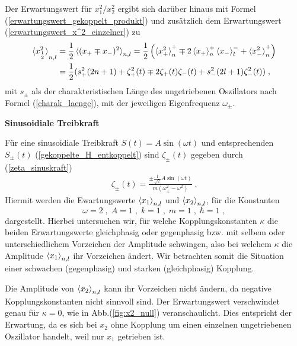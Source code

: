     Der Erwartungswert für $x_{1}^2/x_2^2$ ergibt sich darüber hinaus mit Formel (\ref{erwartungswert_gekoppelt_produkt}) und zusätzlich dem Erwartungswert (\ref{erwartungswert_x^2_einzelner}) zu
    \begin{align}
      \braket{x_{1\atop 2}^2}_{n,l}&=\frac{1}{2}\braket{(x_+\mp x_-)^2}_{n,l}
      =\frac{1}{2}\left(\braket{x_+^2}_n^+ \mp 2\braket{x_+}_n^+\braket{x_-}_l^- + \braket{x_-^2}_n^+\right) \notag\\
      &=\frac 1 2 (s_+^2(2n+1)+\zeta_+^2(t) \mp 2\zeta_+(t)\zeta_-(t) + s_-^2(2l+1)\zeta_-^2(t)) \; ,
    \end{align}
    mit $s_\pm$ als der charakteristischen Länge des ungetriebenen Oszillators nach Formel (\ref{charak_laenge}), mit der jeweiligen Eigenfrequenz $\omega_\pm$.

    \textbf{Sinusoidiale Treibkraft}

    Für eine sinusoidiale Treibkraft $S(t)=A\sin(\omega t)$ und entsprechenden $S_\pm(t)$ (\ref{gekoppelte_H_entkoppelt}) sind $\zeta_\pm(t)$ gegeben durch (\ref{zeta_sinuskraft})
    \begin{align}
      \zeta_\pm(t) = \frac{\pm\frac{1}{\sqrt 2} A\sin(\omega t)}{m(\omega_\pm^2 - \omega^2)} \; .
    \end{align}
    Hiermit werden die Ewartungswerte $\braket{x_1}_{n,l}$ und $\braket{x_2}_{n,l}$, für die Konstanten
    \begin{equation}
      \omega=2 \;,\; A=1 \;,\; k=1 \;,\; m=1 \;,\; \hbar=1 \; ,
    \end{equation}
    dargestellt.
    Hierbei untersuchen wir, für welche Kopplungskonstanten $\kappa$ die beiden Erwartungswerte gleichphasig oder gegenphasig bzw. mit selbem oder unterschiedlichem Vorzeichen der Amplitude schwingen, also bei welchem $\kappa$ die Amplitude $\braket{x_1}_{n,l}$ ihr Vorzeichen ändert.
    Wir betrachten somit die Situation einer schwachen (gegenphasig) und starken (gleichphasig) Kopplung.

    Die Amplitude von $\braket{x_2}_{n,l}$ kann ihr Vorzeichen nicht ändern, da negative Kopplungskonstanten nicht sinnvoll sind. Der Erwartungswert verschwindet genau für $\kappa=0$, wie in Abb.(\ref{fig:x2_null}) veranschaulicht.
    Dies entspricht der Erwartung, da es sich bei $x_2$ ohne Kopplung um einen einzelnen ungetriebenen Oszillator handelt, weil nur $x_1$ getrieben ist.

